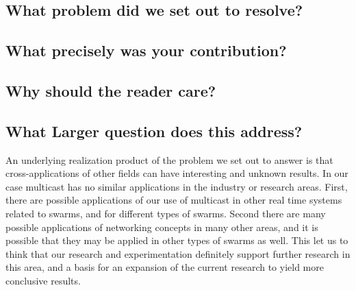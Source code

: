 \documentclass[journal]{IEEEtran}
\begin{document}
\begin{itemize}
\subsection{What problem did we set out to resolve?}
\subsection{What precisely was your contribution?}
\subsection{Why should the reader care?}
\subsection{What Larger question does this address?}
An underlying realization product of the problem we set out to answer is that cross-applications of other fields can have interesting and unknown results. In our case multicast has no similar applications in the industry or research areas. First, there are possible applications of our use of multicast in other real time systems related to swarms, and for different types of swarms. Second there are many possible applications of networking concepts in many other areas, and it is possible that they may be applied in other types of swarms as well. 
This let us to think that our research and experimentation definitely support further research in this area, and a basis for an expansion of the current research to yield more conclusive results. 


\end{itemize}
\end{document}
